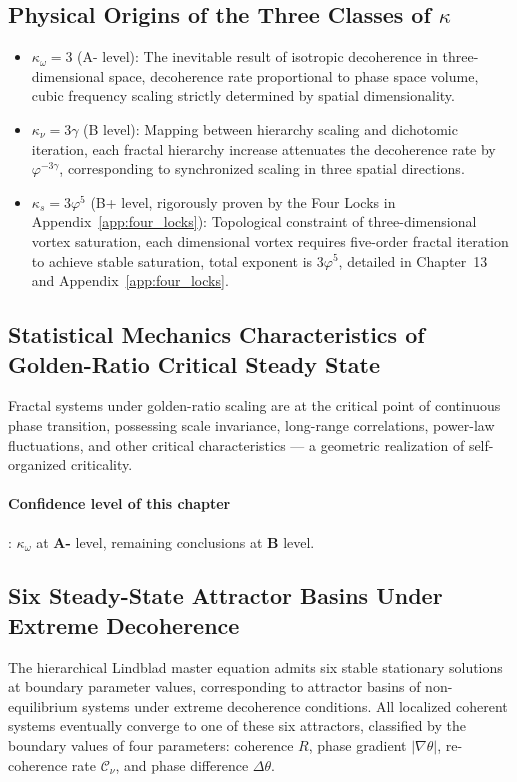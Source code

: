 \documentclass[12pt,a4paper,twocolumn]{article}
\renewcommand{\phi}{\varphi}
\begin{document}
\subsection{Physical Origins of the Three Classes of $\kappa$}
\begin{itemize}
\item $\kappa_\omega = 3$ (A- level): The inevitable result of isotropic decoherence in three-dimensional space, decoherence rate proportional to phase space volume, cubic frequency scaling strictly determined by spatial dimensionality.
\item $\kappa_\nu = 3\gamma$ (B level): Mapping between hierarchy scaling and dichotomic iteration, each fractal hierarchy increase attenuates the decoherence rate by $\phi^{-3\gamma}$, corresponding to synchronized scaling in three spatial directions.
\item $\kappa_s = 3\phi^5$ (B+ level, rigorously proven by the Four Locks in Appendix~\ref{app:four_locks}): Topological constraint of three-dimensional vortex saturation, each dimensional vortex requires five-order fractal iteration to achieve stable saturation, total exponent is $3\phi^5$, detailed in Chapter~13 and Appendix~\ref{app:four_locks}.
\end{itemize}

\subsection{Statistical Mechanics Characteristics of Golden-Ratio Critical Steady State}
Fractal systems under golden-ratio scaling are at the critical point of continuous phase transition, possessing scale invariance, long-range correlations, power-law fluctuations, and other critical characteristics --- a geometric realization of self-organized criticality.

\paragraph{Confidence level of this chapter}: $\kappa_\omega$ at \textbf{A-} level, remaining conclusions at \textbf{B} level.


\subsection{Six Steady-State Attractor Basins Under Extreme Decoherence}
\label{subsec:six_attractors}
The hierarchical Lindblad master equation admits six stable stationary solutions at boundary parameter values, corresponding to attractor basins of non-equilibrium systems under extreme decoherence conditions. All localized coherent systems eventually converge to one of these six attractors, classified by the boundary values of four parameters: coherence $R$, phase gradient $|\nabla\theta|$, re-coherence rate $\mathcal{C}_\nu$, and phase difference $\Delta\theta$.
\end{document}
